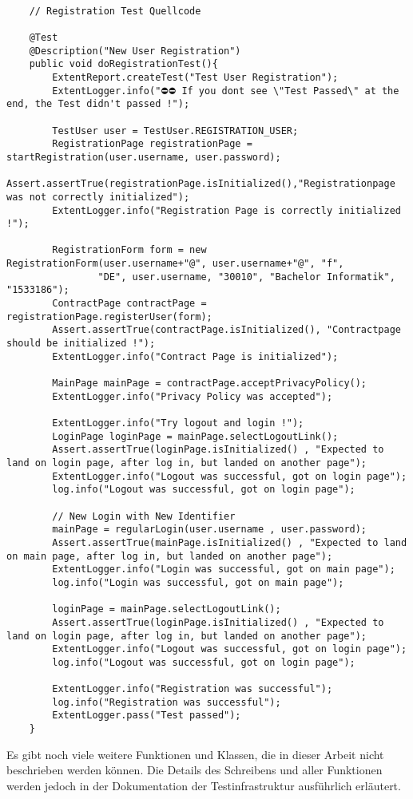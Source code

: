 \begin{lstlisting}[label={lst:reg-test}, caption={Registration Test Quellcode}]

    // Registration Test Quellcode

    @Test
    @Description("New User Registration")
    public void doRegistrationTest(){
        ExtentReport.createTest("Test User Registration");
        ExtentLogger.info("⛔⛔ If you dont see \"Test Passed\" at the end, the Test didn't passed !");

        TestUser user = TestUser.REGISTRATION_USER;
        RegistrationPage registrationPage = startRegistration(user.username, user.password);
        Assert.assertTrue(registrationPage.isInitialized(),"Registrationpage was not correctly initialized");
        ExtentLogger.info("Registration Page is correctly initialized !");

        RegistrationForm form = new RegistrationForm(user.username+"@", user.username+"@", "f",
                "DE", user.username, "30010", "Bachelor Informatik", "1533186");
        ContractPage contractPage = registrationPage.registerUser(form);
        Assert.assertTrue(contractPage.isInitialized(), "Contractpage should be initialized !");
        ExtentLogger.info("Contract Page is initialized");

        MainPage mainPage = contractPage.acceptPrivacyPolicy();
        ExtentLogger.info("Privacy Policy was accepted");

        ExtentLogger.info("Try logout and login !");
        LoginPage loginPage = mainPage.selectLogoutLink();
        Assert.assertTrue(loginPage.isInitialized() , "Expected to land on login page, after log in, but landed on another page");
        ExtentLogger.info("Logout was successful, got on login page");
        log.info("Logout was successful, got on login page");

        // New Login with New Identifier
        mainPage = regularLogin(user.username , user.password);
        Assert.assertTrue(mainPage.isInitialized() , "Expected to land on main page, after log in, but landed on another page");
        ExtentLogger.info("Login was successful, got on main page");
        log.info("Login was successful, got on main page");

        loginPage = mainPage.selectLogoutLink();
        Assert.assertTrue(loginPage.isInitialized() , "Expected to land on login page, after log in, but landed on another page");
        ExtentLogger.info("Logout was successful, got on login page");
        log.info("Logout was successful, got on login page");

        ExtentLogger.info("Registration was successful");
        log.info("Registration was successful");
        ExtentLogger.pass("Test passed");
    }
\end{lstlisting}

Es gibt noch viele weitere Funktionen und Klassen, die in dieser
Arbeit nicht beschrieben werden können. Die Details des Schreibens
und aller Funktionen werden jedoch in der Dokumentation der
Testinfrastruktur ausführlich erläutert.

